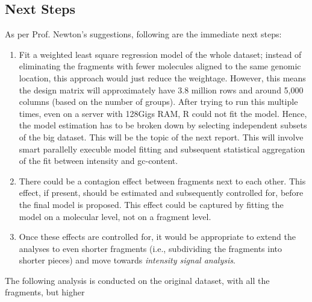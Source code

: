 \documentclass[11pt]{article}
\begin{document}
\subsection{Next Steps}
As per Prof. Newton's suggestions, following are the immediate next steps:
\begin{enumerate}
\item
Fit a weighted least square regression model of the whole dataset; instead of eliminating the fragments with fewer molecules aligned to the same genomic location, this approach would just reduce the weightage. However, this means the design matrix will approximately have 3.8 million rows and around 5,000 columns (based on the number of groups). After trying to run this multiple times, even on a server with 128Gigs RAM, R could not fit the model. Hence, the model estimation has to be broken down by selecting independent subsets of the big dataset. This will be the topic of the next report. This will involve smart parallelly execuble model fitting and subsequent statistical aggregation of the fit between intensity and gc-content.
\item
There could be a contagion effect between fragments next to each other. This effect, if present, should be estimated and subsequently controlled for, before the final model is proposed. This effect could be captured by fitting the model on a molecular level, not on a fragment level. 
\item
Once these effects are controlled for, it would be appropriate to extend the analyses to even shorter fragments (i.e., subdividing the fragments into shorter pieces) and move towards {\emph{intensity signal analysis}}.

\end{enumerate}
The following analysis is conducted on the original dataset, with all the fragments, but higher 
\end{document}
